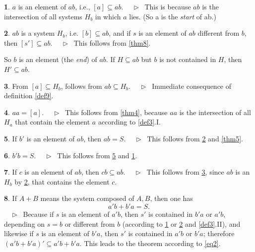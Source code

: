 \documentclass[leqno,hidelinks]{article}
\theoremstyle{definition}
\newtheorem{satz}{\protect\satzname}
\newcommand{\satzname}{}
\renewcommand{\satzname}{\hspace{-4pt}.\ Satz}%
\renewcommand{\satzname}{\hspace{-4pt}.\ Theorem}%
\newcommand\Beweis{\medskip \newline $ \phantom{'.'} \rhd \ $}%
\newcommand\beweis{ $ \phantom{'.'} \rhd \ $}%
\newcommand{\partof}{\subseteq}
\newcommand{\sref}[1]{\underline{\ref{#1}}}%
\begin{document}
\begin{paracol}{2}
\newpage
\begin{satz}\label{thm10}
$a$ is an element of $ab$, i.e., $[a] \partof ab$.
\Beweis
This is because $ab$ is the intersection of all systems $H_b$ in which $a$ lies.
(So a is the \emph{start} of ab.)
\end{satz}

\begin{satz}\label{thm11}
$ab$ is a system $H_b$, i.e. $[b] \partof ab$, and if $s$ is an element of $ab$
different from $b$, then $[s'] \partof ab$.
\Beweis
This follows from \sref{thm8}.
\end{satz}

So $b$ is an element (the \emph{end}) of $ab$. If $H \partof ab$ but $b$ is not
contained in $H$, then $H' \partof ab$.

\begin{satz}\label{thm12}
From $[a] \partof H_b$, follows from $ab \partof H_b$.
\Beweis
Immediate consequence of definition \sref{def9}.
\end{satz}

\begin{satz}\label{thm13}
$aa = [a]$.
\Beweis
This follows from \sref{thm4}, because $aa$ is the intersection of all $H_a$
that contain the element $a$ according to \sref{def3}.I.
\end{satz}

\begin{satz}\label{thm14}
If $b'$ is an element of $ab$, then $ab = S$.
\Beweis
This follows from \sref{thm11} and \sref{thm5}.
\end{satz}

\begin{satz}\label{thm15}
$b' b = S$.
\Beweis
This follows from \sref{thm14} and \sref{thm10}.
\end{satz}

\begin{satz}\label{thm16}
If $c$ is an element of $ab$, then $cb \partof ab$.
\Beweis
This follows from \sref{thm12}, since $ab$ is an $H_b$ by \sref{thm11}, that
contains the element $c$.
\end{satz}

\begin{satz}\label{thm17}
If $A + B$ means the system composed of $A, B$, then one has
\[
	a'b + b'a = S.
\]%
\beweis
Because if $s$ is an element of $a'b$, then $s'$ is contained in $b'a$ or $a'b$,
depending on $s = b$ or different from $b$ (according to \sref{thm10} or
\sref{thm11} and \sref{def3}.II), and likewise if $s$ is an element of $b'a$,
then $s'$ is contained in $a'b$ or $b'a$; therefore $(a'b + b'a)' \partof a'b + b'a$.
This leads to the theorem according to \eqref{eq2}.
\end{satz}


\end{paracol}
\end{document}
